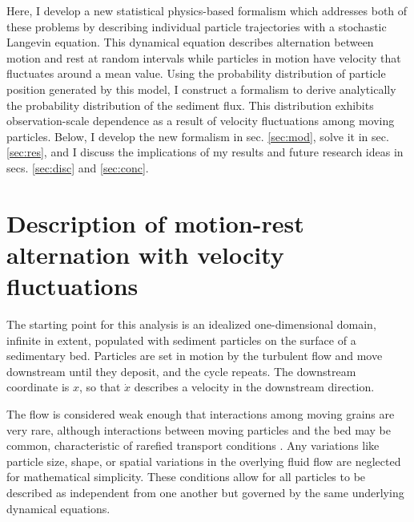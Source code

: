Here, I develop a new statistical physics-based formalism which addresses both of these problems by describing individual particle trajectories with a stochastic Langevin equation.
This dynamical equation describes alternation between motion and rest at random intervals while particles in motion have velocity that fluctuates around a mean value.
Using the probability distribution of particle position generated by this model, I construct a formalism to derive analytically the probability distribution of the sediment flux.
This distribution exhibits observation-scale dependence as a result of velocity fluctuations among moving particles.
Below, I develop the new formalism in sec. \ref{sec:mod}, solve it in sec. \ref{sec:res}, and I discuss the implications of my results and future research ideas in secs. \ref{sec:disc} and \ref{sec:conc}.

\section{Description of motion-rest alternation with velocity fluctuations \label{sec:mod}}
The starting point for this analysis is an idealized one-dimensional domain, infinite in extent, populated with sediment particles on the surface of a sedimentary bed.
Particles are set in motion by the turbulent flow and move downstream until they deposit, and the cycle repeats.
The downstream coordinate is $x$, so that $\dot{x}$ describes a velocity in the downstream direction.

The flow is considered weak enough that interactions among moving grains are very rare, although interactions between moving particles and the bed may be common, characteristic of rarefied transport conditions \citep[e.g.][]{Kumaran2006,Furbish2017}. Any variations like particle size, shape, or spatial variations in the overlying fluid flow are neglected for mathematical simplicity.
These conditions allow for all particles to be described as independent from one another but governed by the same underlying dynamical equations.


